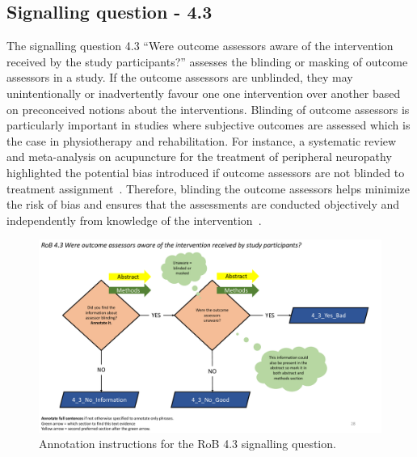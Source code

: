 \documentclass[sn-mathphys,Numbered]{sn-jnl}%
\begin{document}
\subsection*{Signalling question - 4.3 }
\label{subsec:4_3}
%
The signalling question 4.3 ``Were outcome assessors aware of the intervention received by the study participants?'' assesses the blinding or masking of outcome assessors in a study.
If the outcome assessors are unblinded, they may unintentionally or inadvertently favour one one intervention over another based on preconceived notions about the interventions.
Blinding of outcome assessors is particularly important in studies where subjective outcomes are assessed which is the case in physiotherapy and rehabilitation.
For instance, a systematic review and meta-analysis on acupuncture for the treatment of peripheral neuropathy highlighted the potential bias introduced if outcome assessors are not blinded to treatment assignment~\cite{dimitrova2017acupuncture}.
Therefore, blinding the outcome assessors helps minimize the risk of bias and ensures that the assessments are conducted objectively and independently from knowledge of the intervention~\cite{watanabe2022treatment,hrobjartsson2013observer}.
%
%
%
\begin{figure}[hbt]
    \centering
    \includegraphics[width=\textwidth]{figures/4_3.pdf}
    \caption{Annotation instructions for the RoB 4.3 signalling question.}
    \label{fig:4_3}
\end{figure}
%
%
%
\end{document}
